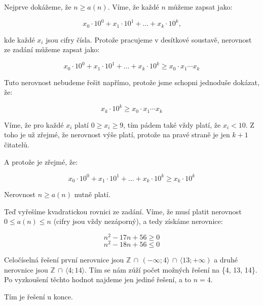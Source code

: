 \documentclass{fkssolpub}
\author{Ondřej Sedláček}
\begin{document}
 

Nejprve dokážeme, že $n \geq a(n)$. Víme, že každé $n$ můžeme zapsat
jako:

\[
  x_0 \cdot 10^0 + x_1 \cdot 10^1 + \dots + x_k \cdot 10^k \text{,}
\]

kde každé $x_i$ jsou cifry čísla. Protože pracujeme v desítkové
soustavě, nerovnost ze zadání můžeme zapsat jako:

\[
  x_0 \cdot 10^0 + x_1 \cdot 10^1 + \dots + x_k \cdot 10^k 
    \geq x_0 \cdot x_1 \cdots x_k
\]

Tuto nerovnost nebudeme řešit napřímo, protože jsme schopni jednoduše
dokázat, že:

\[
  x_k \cdot 10^k \geq x_0 \cdot x_1 \cdots x_k
\]

Víme, že pro každé $x_i$ platí $0 \geq x_i \geq 9$, tím pádem také vždy platí,
že $x_i < 10$. Z toho je už zřejmé, že nerovnost výše platí, protože na pravé
straně je jen $k + 1$ čitatelů.

A protože je zřejmé, že:

\[
  x_0 \cdot 10^0 + x_1 \cdot 10^1 + \dots + x_k \cdot 10^k \geq x_k \cdot 10^k
\]

Nerovnost $n \geq a(n)$ nutně platí.

Teď vyřešíme kvadratickou rovnici ze zadání. Víme, že musí platit nerovnost
$0 \leq a(n) \leq n$ (cifry jsou vždy nezáporný), a tedy získáme nerovnice:

\[
  n^2 - 17n + 56 \geq 0
\]
\[
  n^2 - 18n + 56 \leq 0
\]

Celočíselná řešení první nerovnice jsou 
$\mathbb{Z} \, \cap \, (- \infty; 4 \rangle \, \cap \, \langle 13; + \infty)$ a 
druhé nerovnice jsou $\mathbb{Z} \, \cap \, \langle 4 ; 14 \rangle$. Tím se
nám zúží počet možných řešení na \{4, 13, 14\}. Po vyzkoušení těchto hodnot
najdeme jen jediné řešení, a to $n = 4$.

Tím je řešení u konce.
\end{document}
